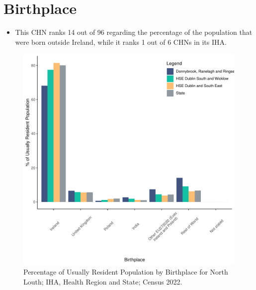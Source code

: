 \documentclass{article}
\begin{document}
\section{Birthplace}\label{sect:Birth}
\begin{itemize}
\item This CHN ranks  14 out of 96 regarding the percentage of the population that were born outside Ireland, while it ranks  1 out of 6 CHNs in its IHA.
\end{itemize}
\begin{figure}[H]
	\centering
	\includegraphics[width = 130mm]{../figures/BirthED.pdf}
	\caption{Percentage of Usually Resident Population by Birthplace for North Louth; IHA, Health Region and State; Census 2022.}
	\label{fig:vbnv}
	\end{figure}
	
\end{document}
